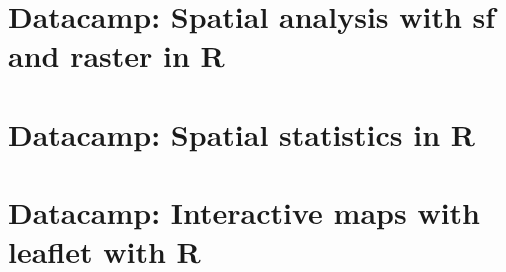 \documentclass{article}
\begin{document}
\section{Datacamp: Spatial analysis with sf and raster in R}

\section{Datacamp: Spatial statistics in R}

\section{Datacamp: Interactive maps with leaflet with R}
\end{document}
